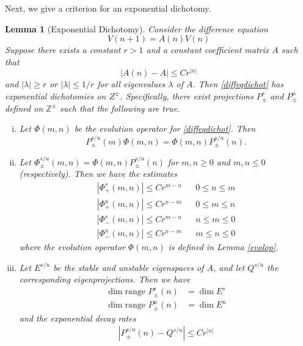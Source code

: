 \documentclass[12pt]{elsarticle}
\def\Z{{\mathbb Z}}
\newtheorem{lemma}{Lemma}
\begin{document}
Next, we give a criterion for an exponential dichotomy.

\begin{lemma}[Exponential Dichotomy]\label{dichotomy}
Consider the difference equation
\begin{equation}\label{diffeqdichot}
V(n+1) = A(n) V(n)
\end{equation}
Suppose there exists a constant $r > 1$ and a constant coefficient matrix $A$ such that 
\begin{equation}\label{Anexpdecay}
|A(n) - A| \leq C r^{|n|}
\end{equation}
and $|\lambda| \geq r$ or $|\lambda| \leq 1/r$ for all eigenvalues $\lambda$ of $A$. Then \eqref{diffeqdichot} has exponential dichotomies on $Z^\pm$. Specifically, there exist projections $P_\pm^s$ and $P_\pm^u$ defined on $\Z^\pm$ such that the following are true.
\begin{enumerate}[(i)]
\item Let $\Phi(m, n)$ be the evolution operator for \eqref{diffeqdichot}. Then 
\begin{equation}\label{projcommute}
P_\pm^{s/u}(m) \Phi(m, n) =  \Phi(m, n) P_\pm^{s/u}(n).
\end{equation}

\item Let $\Phi_\pm^{s/u}(m, n) = \Phi(m, n) P_\pm^{s/u}(n)$ for $m, n \geq 0$ and $m, n \leq 0$ (respectively). Then we have the estimates
\begin{align*}
|\Phi_+^s(m, n)| \leq C r^{m - n} && 0 \leq n \leq m \\
|\Phi_+^u(m, n)| \leq C r^{n - m} && 0 \leq m \leq n \\
|\Phi_-^s(m, n)| \leq C r^{m - n} && n \leq m \leq 0 \\
|\Phi_-^u(m, n)| \leq C r^{n - m} && m \leq n \leq 0
\end{align*}
where the evolution operator $\Phi(m, n)$ is defined in Lemma \ref{evolop}. 

\item Let $E^{s/u}$ be the stable and unstable eigenspaces of $A$, and let $Q^{s/u}$ the corresponding eigenprojections. Then we have
\begin{align*}
\dim \textrm{range }P_\pm^s(n) &= \dim E^s \\
\dim \textrm{range }P_\pm^u(n) &= \dim E^u
\end{align*}
and the exponential decay rates
\begin{align}\label{projexpdecay}
| P_\pm^{s/u}(n) - Q^{s/u} | \leq C r^{|n|}
\end{align}
\end{enumerate}


\end{lemma}
\end{document}
